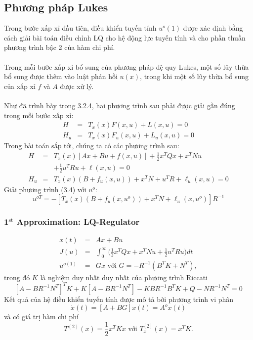 \documentclass[12pt,a4paper]{report}
\begin{document}
\subsection{Phương pháp Lukes} Trong bước xấp xỉ đầu tiên, điều khiển tuyến tính $u^o(1)$ được xác định bằng cách giải bài toán điều chỉnh LQ cho hệ động lực tuyến tính và cho phần thuần phương trình bậc 2 của hàm chi phí. \\\\ Trong mỗi bước xấp xỉ bổ sung của phương pháp đệ quy Lukes, một số lũy thừa bổ sung được thêm vào luật phản hồi $u(x)$, trong khi một số lũy thừa bổ sung của xấp xỉ $f$ và $A$ được xử lý.\\\\ Như đã trình bày trong 3.2.4, hai phương trình sau phải được giải gần đúng trong mỗi bước xấp xỉ: \begin{eqnarray}
	H &=& T_x(x)F(x, u) + L(x, u) = 0\\ H_u &=& T_x(x)F_u(x, u) + L_u(x, u) = 0
\end{eqnarray} Trong bài toán sắp tới, chúng ta có các phương trình sau: \begin{eqnarray}
	H &=&T_x(x)[Ax+Bu+f(x, u)] + \frac{1}{2}x^TQx + x^TNu \nonumber\\ && + \frac{1}{2}u^TRu + \ell(x, u) = 0\\ H_u &=& T_x(x)(B + f_u(x, u)) + x^TN + u^TR + \ell_u(x, u) = 0
\end{eqnarray}
Giải phương trình (3.4) với $u^o$: \begin{equation}
	u^{oT} = -[T_x(x)(B + f_u(x, u^o)) + x^TN + \ell_u(x, u^o)]R^{-1}
\end{equation}
\subsubsection{1$^\text{st}$ Approximation: LQ-Regulator} \begin{eqnarray}
	\dot{x}(t) &=& Ax + Bu \nonumber \\
	J(u) &=& \int_{0}^{\infty}\bigg(\frac{1}{2}x^TQx + x^TNu + \frac{1}{2}u^TRu\bigg)dt \nonumber \\ u^{o(1)} &=& Gx \text{ với } G = -R^{-1}(B^TK + N^T), \nonumber
\end{eqnarray} trong đó $K$ là nghiệm duy nhất duy nhất của phương trình Riccati $$[A-BR^{-1}N^T]^TK + K[A-BR^{-1}N^T] - KBR^{-1}B^TK + Q - NR^{-1}N^T = 0$$ Kết quả của hệ điều khiển tuyến tính được mô tả bởi phương trình vi phân $$\dot{x}(t) = [A + BG]x(t) = A^ox(t)$$ và có giá trị hàm chi phí $$T^{(2)}(x) = \frac{1}{2}x^TKx \text{ với } T_x^{[2]}(x) = x^TK.$$
\end{document}
